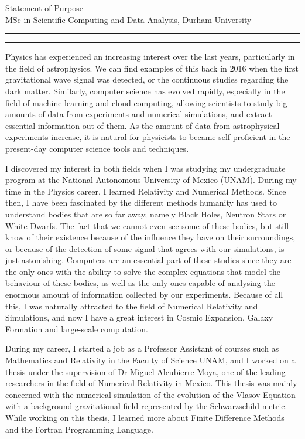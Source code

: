 \documentclass{article}
\newcommand{\soptitle}{Statement of Purpose}
\begin{document}
\begin{center}\LARGE\soptitle\\
\large MSc in Scientific Computing and Data Analysis, Durham University
\end{center}

\hrule
\vspace{1pt}
\hrule height 1pt

\bigskip

Physics has experienced an increasing interest over the last years, particularly in the field of astrophysics. We can find examples of this back in 2016 when the first gravitational wave signal was detected, or the continuous studies regarding the dark matter. Similarly, computer science has evolved rapidly, especially in the field of machine learning and cloud computing, allowing scientists to study big amounts of data from experiments and numerical simulations, and extract essential information out of them. As the amount of data from astrophysical experiments increase, it is natural for physicists to became self-proficient in the present-day computer science tools and techniques.

\vspace{.5cm}

I discovered my interest in both fields when I was studying my undergraduate program at the National Autonomous University of Mexico (UNAM). During my time in the Physics career, I learned Relativity and Numerical Methods. Since then, I have been fascinated by the different methods humanity has used to understand bodies that are so far away, namely Black Holes, Neutron Stars or White Dwarfs. The fact that we cannot even see some of these bodies, but still know of their existence because of the influence they have on their surroundings, or because of the detection of some signal that agrees with our simulations, is just astonishing. Computers are an essential part of these studies since they are the only ones with the ability to solve the complex equations that model the behaviour of these bodies, as well as the only ones capable of analysing the enormous amount of information collected by our experiments. Because of all this, I was naturally attracted to the field of Numerical Relativity and Simulations, and now I have a great interest in Cosmic Expansion, Galaxy Formation and large-scale computation.

\vspace{.5cm}

During my career, I started a job as a Professor Assistant of courses such as Mathematics and Relativity in the Faculty of Science UNAM, and I worked on a thesis under the supervision of  \href{https://sigi.nucleares.unam.mx/sgiicn/people/user/view/id/8}{Dr Miguel Alcubierre Moya}, one of the leading researchers in the field of Numerical Relativity in Mexico. This thesis was mainly concerned with the numerical simulation of the evolution of the Vlasov Equation with a background gravitational field represented by the Schwarzschild metric. While working on this thesis, I learned more about Finite Difference Methods and the Fortran Programming Language. 
\end{document}
